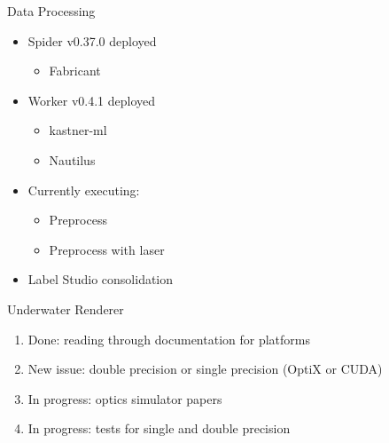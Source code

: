 \begin{frame}{Data Processing}
    \begin{itemize}
        \item Spider v0.37.0 deployed
        \begin{itemize}
            \item Fabricant
        \end{itemize}
        \item Worker v0.4.1 deployed
        \begin{itemize}
            \item kastner-ml
            \item Nautilus
        \end{itemize}
        \item Currently executing:
        \begin{itemize}
            \item Preprocess
            \item Preprocess with laser
        \end{itemize}
        \item Label Studio consolidation
    \end{itemize}
\end{frame}

\begin{frame}{Underwater Renderer}
	\begin{enumerate}
		\item Done: reading through documentation for platforms
		\item New issue: double precision or single precision (OptiX or CUDA)
		\item In progress: optics simulator papers
		\item In progress: tests for single and double precision
	\end{enumerate}
\end{frame}

